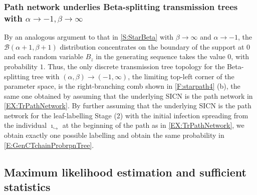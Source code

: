 \documentclass[review]{elsarticle}
\numberwithin{equation}{section}
\let\orgautoref\autoref
\renewcommand{\autoref}
        {\def\equationautorefname{Eq.}%
         \def\figureautorefname{Fig.}%
         \def\subfigureautorefname{Fig.}%
         \def\sectionautorefname{Sect.}%
         \def\subsectionautorefname{Sect.}%
         \def\subsubsectionautorefname{Sect.}%
         \def\Itemautorefname{item}%
         \def\tableautorefname{Table}%
         \def\propositionautorefname{Prop.}%
         \def\corollaryautorefname{Corollary}%
         \def\theoremautorefname{Theorem}%
         \def\remarkautorefname{Remark}%
         \def\lemmaautorefname{Lemma}%
         \def\proofofautorefname{Proof}%
         \def\exampleautorefname{Example}%
         \orgautoref}
\def\calB{\mathcal{B}}
\begin{document}
\subsubsection{Path network underlies Beta-splitting transmission trees with $\alpha \to -1, \beta \to \infty$}\label{S:PathNetworkbetaSplitting}

By an analogous argument to that in \autoref{S:StarBeta} with $\beta \to \infty$ and $\alpha \to -1$, the $\calB(\alpha+1,\beta+1)$ distribution concentrates on the boundary of the support at $0$ and each random variable $B_z$ in the generating sequence takes the value $0$, with probability $1$.  
Thus, the only discrete transmission tree topology for the Beta-splitting tree with $(\alpha,\beta) \to (-1,\infty)$, the limiting top-left corner of the parameter space, is the right-branching comb shown in \autoref{F:starpath4} (b), the same one obtained by assuming that the underlying SICN is the path network in \autoref{EX:TrPathNetwork}.  
By further assuming that the underlying SICN is the path network for the leaf-labelling Stage (2) with the initial infection spreading from the individual $\imath_{\hookrightarrow}$ at the beginning of the path as in \autoref{EX:TrPathNetwork}, we obtain exactly one possible labelling and obtain the same probability in \autoref{E:GenCTchainProbrpnTree}. 


\subsection{Maximum likelihood estimation and sufficient statistics}\label{S:MLE}
\end{document}
